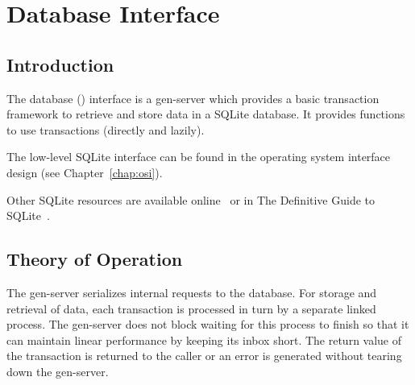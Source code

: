 %
%
%

\chapter {Database Interface}\label{chap:db}

\section {Introduction}

The database () interface is a gen-server which provides a
basic transaction framework to retrieve and store data in a SQLite
database. It provides functions to use transactions (directly and
lazily).

The low-level SQLite interface can be found in the operating system
interface design (see Chapter~\ref{chap:osi}).

Other SQLite resources are available online~\cite{sqlite} or in The
Definitive Guide to SQLite~\cite{sqlite-guide}.

\section {Theory of Operation}

The  gen-server serializes internal requests to the
database.  For storage and retrieval of data, each transaction is
processed in turn by a separate linked process.  The gen-server does
not block waiting for this process to finish so that it can maintain
linear performance by keeping its inbox short. The return value of the
transaction is returned to the caller or an error is generated without
tearing down the gen-server.

